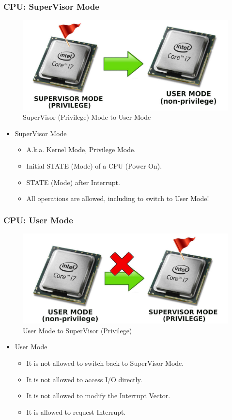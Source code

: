 \documentclass[aspectratio=169, xcolor=table, notheorems, hyperref={pdfpagelabels=false}]{beamer}
\begin{document}
\begin{frame}
\frametitle{CPU: SuperVisor Mode}
\begin{figure}
\includegraphics[width=0.50\linewidth]{os-super2user}
\caption{SuperVisor (Privilege) Mode to User Mode}
\end{figure}
\begin{itemize}
\item SuperVisor Mode
\begin{itemize}
\item A.k.a. Kernel Mode, Privilege Mode.
\item Initial STATE (Mode) of a CPU (Power On).
\item STATE (Mode) after Interrupt.
\item All operations are allowed, including to switch to User Mode!
\end{itemize}
\end{itemize}
\end{frame}

\begin{frame}
\frametitle{CPU: User Mode}
\begin{figure}
\includegraphics[width=0.50\linewidth]{os-user2super}
\caption{User Mode to SuperVisor (Privilege)}
\end{figure}
\begin{itemize}
\item User Mode
\begin{itemize}
\item It is not allowed to switch back to SuperVisor Mode.
\item It is not allowed to access I/O directly.
\item It is not allowed to modify the Interrupt Vector.
\item It is allowed to request Interrupt.
\end{itemize}
\end{itemize}
\end{frame}
\end{document}
